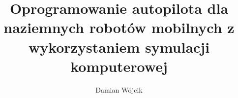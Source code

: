 \title{Oprogramowanie autopilota dla naziemnych robotów mobilnych z wykorzystaniem symulacji komputerowej}
\author{Damian Wójcik}
